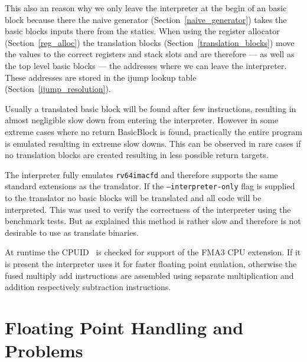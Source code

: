 \documentclass[course=eragp]{aspdoc}
\begin{document}
\par

This also an reason why we only leave the interpreter at the begin of an basic block because there
the naive generator (Section~\ref{naive_generator}) takes the basic blocks inputs there from the statics.
When using the register allocator (Section~\ref{reg_alloc}) the translation blocks
(Section~\ref{translation_blocks}) move the values to the correct registers and stack slots and are
therefore --- as well as the top level basic blocks --- the addresses where we can leave the
interpreter. These addresses are stored in the ijump lookup table (Section~\ref{ijump_resolution}).

\par

Usually a translated basic block will be found after few instructions, resulting in almost
negligible slow down from entering the interpreter. However in some extreme cases where no return
BasicBlock is found, practically the entire program is emulated resulting in extreme slow downs.
This can be observed in rare cases if no translation blocks are created resulting in less possible
return targets.

\par

The interpreter fully emulates \texttt{rv64imacfd} and therefore supports the same standard
extensions as the translator. If the \texttt{--interpreter-only} flag is supplied to the translator no
basic blocks will be translated and all code will be interpreted. This was used to verify the
correctness of the interpreter using the benchmark tests. But as explained this method is rather
slow and therefore is not desirable to use as translate binaries.

\par

At runtime the CPUID~\cite{intel2017man} is checked for support of the FMA3 CPU extension. If it is
present the interpreter uses it for faster floating point enulation, otherwise the fused multiply
add instructions are assembled using separate multiplication and addition respectively subtraction
instructions.

\par

\section{Floating Point Handling and Problems}\label{sec:floating_point}
\end{document}
